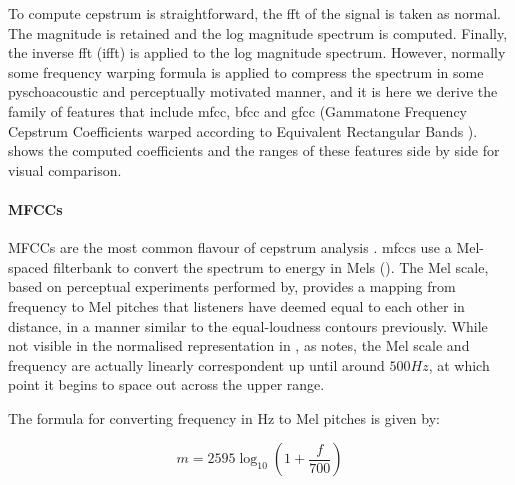 {{To compute cepstrum is straightforward, the \acrshort{fft} of the signal is taken as normal. The magnitude is retained and the log magnitude spectrum is computed. Finally, the inverse \acrshort{fft} (\acrshort{ifft}) is applied to the log magnitude spectrum. However, normally some frequency warping formula is applied to compress the spectrum in some pyschoacoustic and perceptually motivated manner, and it is here we derive the family of features that include \acrfull{mfcc}, \acrfull{bfcc} and \acrshort{gfcc} (Gammatone Frequency Cepstrum Coefficients warped according to Equivalent Rectangular Bands \citep{Shao2009}).  shows the computed coefficients and the ranges of these features side by side for visual comparison.

\paragraph{MFCCs}

MFCCs are the most common flavour of cepstrum analysis \citep{Kim2006}. \acrshort{mfcc}s use a Mel-spaced filterbank to convert the spectrum to energy in Mels (). The Mel scale, based on perceptual experiments performed by, provides a mapping from frequency to Mel pitches that listeners have deemed equal to each other in distance, in a manner similar to the equal-loudness contours previously. While not visible in the normalised representation in , as \cite{Kim2006} notes, the Mel scale and frequency are actually linearly correspondent up until around $500Hz$, at which point it begins to space out across the upper range.

The formula for converting frequency in Hz to Mel pitches is given by:

  \begin{equation}
	\label{eq:mel}	
	m = 2595\log_10 (1+\frac{f}{700})
	\end{equation}
	
}}

